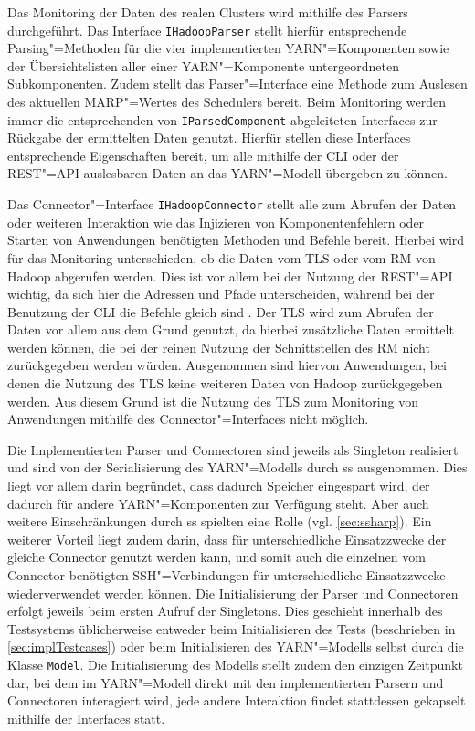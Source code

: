 Das Monitoring der Daten des realen Clusters wird mithilfe des Parsers durchgeführt.
Das Interface \texttt{IHadoopParser} stellt hierfür entsprechende Parsing"=Methoden für die vier implementierten \ac{YARN}"=Komponenten sowie der Übersichtslisten aller einer \ac{YARN}"=Komponente untergeordneten Subkomponenten.
Zudem stellt das Parser"=Interface eine Methode zum Auslesen des aktuellen \ac{MARP}"=Wertes des Schedulers bereit.
Beim Monitoring werden immer die entsprechenden von \texttt{IParsedComponent} abgeleiteten Interfaces zur Rückgabe der ermittelten Daten genutzt.
Hierfür stellen diese Interfaces entsprechende Eigenschaften bereit, um alle mithilfe der \ac{CLI} oder der REST"=API auslesbaren Daten an das \ac{YARN}"=Modell übergeben zu können.

Das Connector"=Interface \texttt{IHadoopConnector} stellt alle zum Abrufen der Daten oder weiteren Interaktion wie das Injizieren von Komponentenfehlern oder Starten von Anwendungen benötigten Methoden und Befehle bereit.
Hierbei wird für das Monitoring unterschieden, ob die Daten vom \ac{TLS} oder vom \ac{RM} von Hadoop abgerufen werden.
Dies ist vor allem bei der Nutzung der REST"=API wichtig, da sich hier die Adressen und Pfade unterscheiden, während bei der Benutzung der \ac{CLI} die Befehle gleich sind .
Der \ac{TLS} wird zum Abrufen der Daten vor allem aus dem Grund genutzt, da hierbei zusätzliche Daten ermittelt werden können, die bei der reinen Nutzung der Schnittstellen des \ac{RM} nicht zurückgegeben werden würden.
Ausgenommen sind hiervon Anwendungen, bei denen die Nutzung des \ac{TLS} keine weiteren Daten von Hadoop zurückgegeben werden\cite{HadoopYarnTlServer271,HadoopYarnCmds271,HadoopRmApi271,HadoopNmApi271}.
Aus diesem Grund ist die Nutzung des \ac{TLS} zum Monitoring von Anwendungen mithilfe des Connector"=Interfaces nicht möglich.

Die Implementierten Parser und Connectoren sind jeweils als Singleton realisiert und sind von der Serialisierung des \ac{YARN}"=Modells durch \ac{ss} ausgenommen.
Dies liegt vor allem darin begründet, dass dadurch Speicher eingespart wird, der dadurch für andere \ac{YARN}"=Komponenten zur Verfügung steht.
Aber auch weitere Einschränkungen durch \ac{ss} spielten eine Rolle (vgl. \cref{sec:ssharp}).
Ein weiterer Vorteil liegt zudem darin, dass für unterschiedliche Einsatzzwecke der gleiche Connector genutzt werden kann, und somit auch die einzelnen vom Connector benötigten SSH"=Verbindungen für unterschiedliche Einsatzzwecke wiederverwendet werden können.
Die Initialisierung der Parser und Connectoren erfolgt jeweils beim ersten Aufruf der Singletons.
Dies geschieht innerhalb des Testsystems üblicherweise entweder beim Initialisieren des Tests (beschrieben in \cref{sec:implTestcases}) oder beim Initialisieren des \ac{YARN}"=Modells selbst durch die Klasse \texttt{Model}.
Die Initialisierung des Modells stellt zudem den einzigen Zeitpunkt dar, bei dem im \ac{YARN}"=Modell direkt mit den implementierten Parsern und Connectoren interagiert wird, jede andere Interaktion findet stattdessen gekapselt mithilfe der Interfaces statt.

